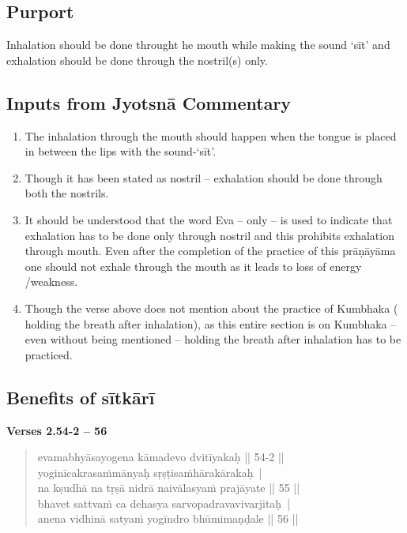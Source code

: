 \subsection*{Purport}


Inhalation should be done throught he mouth while making the sound ‘sīt’ and exhalation should be done through the nostril(s) only.

\subsection*{Inputs from Jyotsnā Commentary}


\begin{enumerate}
\itemsep=0pt
\item The inhalation through the mouth should happen when the tongue is placed in between the lips with the sound-‘sīt’.
\item Though it has been stated as nostril – exhalation should be done through both the nostrils. 
\item It should be understood that the word Eva – only – is used to indicate that exhalation has to be done only through nostril and this prohibits exhalation through mouth. Even after the completion of the practice of this prāṇāyāma one should not exhale through the mouth as it leads to loss of energy /weakness. 
\item Though the verse above does not mention about the practice of Kumbhaka ( holding the breath after inhalation), as this entire section is on Kumbhaka – even without being mentioned – holding the breath after inhalation has to be practiced. 
\end{enumerate}
\newpage

\subsection*{Benefits of sītkārī}


\noindent \textbf{Verses 2.54-2 -- 56}

\begin{verse}
evamabhyāsayogena kāmadevo dvitīyakaḥ || 54-2 ||\\
yoginīcakrasaṁmānyaḥ sṛṣṭisaṁhārakārakaḥ |\\
na kṣudhā na tṛṣā nidrā naivālasyaṁ prajāyate || 55 ||\\
bhavet sattvaṁ ca dehasya sarvopadravavivarjitaḥ |\\
anena vidhinā satyaṁ yogīndro bhūmimaṇḍale || 56 ||
\end{verse}

